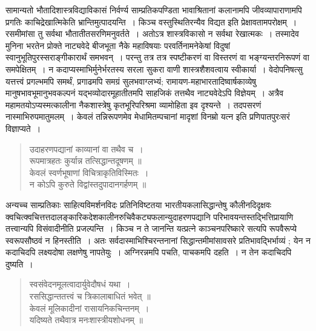 {\dev सामान्यतो भौतादिशास्त्रविद्याविकासं निर्वर्ण्य साम्प्रतिकपण्डिता भावाश्रितानां कलानामपि जीवव्यापाराणामपि प्रगतिः काचिद्रेखात्मिकेति भ्रान्तिमुत्पादयन्ति~। किञ्च वस्तुस्थितिरन्यैव विद्यत इति प्रेक्षावतामपरोक्षम्~। रसमीमांसा तु सर्वथा भौतातीतसरणिमनुवर्तते~। अतोऽत्र शास्त्रविकासो न सर्वथा रेखात्मकः~। तस्मादेव मुनिना भरतेन प्रोक्ते नाट्यवेदे बीजभूता नैके महाविषयाः परवर्तिनामनेकेषां विदुषां स्वानुभूतिपुरस्सराङ्गीकारार्थं समभवन्~। परन्तु तत्र तत्र स्पष्टीकरणं वा विस्तरणं वा भङ्ग्यन्तरनिरूपणं वा समपेक्षितम्~। न कदाप्यस्माभिर्मुनेर्भरतस्य सरला सुकरा वाणी शास्त्रशैशवत्वाय स्वीकार्या~। वेदोपनिषत्सु यत्तत्त्वं प्रगल्भमपि समर्थं, प्रगाढमपि समग्रं सुलभवाग्लभ्यं; रामायण-महाभारतादिष्वार्षकाव्येषु मानुषभावभूमानुभव\-कल्पनं यद्भव्योदारमूहातीतमपि साहजिकं तत्तथैव नाट्यवेदेऽपि विज्ञेयम्~। अत्रैव महामतयोऽप्यस्मत्कालीना नैकशास्त्रेषु कृतभूरिपरिश्रमा व्यामोहिता इव दृश्यन्ते~। तदपसरणं नास्माभिरुपमातुमलम्~। केवलं तन्निरूपणमेव मेधामितम्पचानां मादृशां विनम्रो यत्न इति प्रणिपातपुरःसरं विज्ञाप्यते~।}
\begin{quote}
{\dev उदाहरणपद्यानां काव्यानां वा तथैव च~।}\\
{\dev रूपमात्रहतः कुर्यान्न तत्सिद्धान्तदूषणम् ॥}\\[5pt]
{\dev केवलं स्वर्णभूषाणां विचित्राकृतिविस्मितः~।}\\
{\dev न कोऽपि कुरुते विद्वांस्तदुपादानगर्हणम् ॥}
\end{quote}

{\dev अन्यच्च साम्प्रतिकाः साहित्यविमर्शनविदः प्रतिनिविष्टतया भारतीयकलासिद्धान्तेषु कौलीन\-दिदृक्षवः क्वचित्क्वचित्तत्तदालङ्कारिकदेशकालीनरुचिवैकट्यफलान्युदाहरणपद्यानि परिभाव\-यन्त\-स्तद्भित्तिप्रायाणि तत्त्वान्यपि विसंवादीनीति प्रजल्पन्ति~। किञ्च न ते जानन्ति यत्प्रत्ने काञ्चन\-परिष्कारे सत्यपि रूपवैरूप्ये स्वरूपसौष्ठवं न हिनस्तीति~। अतः सर्वदास्माभिश्चिरन्त\-नानां सिद्धान्तमीमांसावसरे प्रतिभावद्भिर्भाव्यं ; येन न कदाचिदपि लक्ष्यदोषा लक्षणेषु नापतेयुः~। अग्निरन्नमपि पचति, पाचकमपि दहति~। न तेन कदाचिदपि दुष्यति~।}  
\begin{quote}
{\dev स्वसंवेदनमूलत्वादार्युवेदौषधं यथा~।}\\
{\dev रससिद्धान्ततत्त्वं च त्रिकालाबाधितं भवेत् ॥}\\[5pt]
{\dev केवलं मूलिकादीनां रासायनिकचिन्तनम्~।}\\
{\dev यदिष्यते तथैवात्र मनःशास्त्रीयशोधनम् ॥}
\end{quote}


